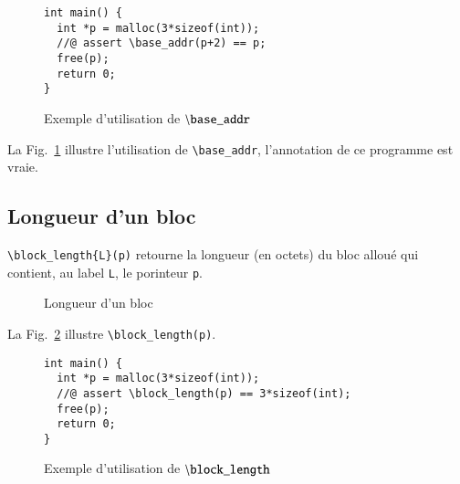 \documentclass[french]{spimufcphdthesis}
\begin{document}
\begin{figure}[h]
\begin{lstlisting}
int main() {
  int *p = malloc(3*sizeof(int));
  //@ assert \base_addr(p+2) == p;
  free(p);
  return 0;
}
\end{lstlisting}
\caption{Exemple d'utilisation de ${\tt \backslash base\_addr}$}
\label{fig:base-addr-example}
\end{figure}

La Fig.~\ref{fig:base-addr-example}
illustre l'utilisation de \lstinline{\base_addr}, l'annotation de ce
programme est vraie.


\subsection{Longueur d'un bloc}

\lstinline'\block_length{L}(p)' retourne la longueur (en octets) du
bloc alloué qui contient, au label \lstinline{L}, le porinteur \lstinline{p}. 


\begin{figure}[h]
  \begin{center}
  \end{center}
  \caption{Longueur d'un bloc}
  \label{fig:block-length}
\end{figure}

La Fig.~\ref{fig:block-length} illustre \lstinline{\block_length(p)}.

\begin{figure}[h]
\begin{lstlisting}
int main() {
  int *p = malloc(3*sizeof(int));
  //@ assert \block_length(p) == 3*sizeof(int);
  free(p);
  return 0;
}
\end{lstlisting}
\caption{Exemple d'utilisation de ${\tt \backslash block\_length}$}
\label{fig:block-length-example}
\end{figure}
\end{document}
